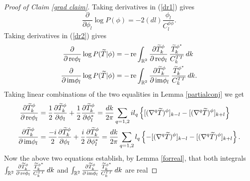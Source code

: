 \documentclass[noinfoline]{imsart}
\newcommand{\re}{\text{\,\rm re}}
\newcommand{\im}{\text{\,\rm im}}
\begin{document}
\begin{proof}[{ Proof of Claim \ref{grad claim}}]
Taking derivatives in (\ref{dr1}) gives
\begin{equation}
\label{grad of prior}
\frac{\partial}{\partial \phi_l}\log P(\phi) = - 2(dl) \frac{\phi_l}{C^{\phi\phi}_{l}}.
\end{equation}
Taking derivatives in (\ref{dr2}) gives
\begin{align}
\frac{\partial}{\partial \re\phi_l}\log P(\widetilde T| \phi) 
&= - \re \int_{\Bbb R^2} \frac{\partial \widetilde T_k^{\phi}}{\partial \re\phi_l} \, \frac{\widetilde T_k^{\phi^*}}{C_k^{TT}}  \,dk \label{ll1}\\
\frac{\partial}{\partial \im\phi_l}\log P(\widetilde T| \phi) 
&=  -\re \int_{\Bbb R^2}\frac{\partial \widetilde T_k^{\phi}}{\partial \im\phi_l} \, \frac{\widetilde T_k^{\phi^*}}{C_k^{TT}} \, dk \label{ll2}.
\end{align}
Taking linear combinations of the two equalities in Lemma \ref{partialconj} we get
\begin{align}
\frac{\partial \widetilde T^\phi_k}{\partial \re \phi_{l}}  &= 
\frac{1}{2}\frac{\partial \widetilde T^\phi_k}{\partial\phi_{l}} + \frac{1}{2}\frac{\partial \widetilde T^\phi_k}{\partial\phi^*_{l}}
=
\frac{dk}{2 \pi}  \sum_{q=1,2} il_q\left\{ [(\nabla^q\widetilde T)^\phi]_{k-l}  -   [(\nabla^q\widetilde T)^\phi]_{k+l}  \right\}\\
\frac{\partial \widetilde T^\phi_k}{\partial \im \phi_{l} }  &= 
\frac{-i}{2}\frac{\partial \widetilde T^\phi_k}{\partial\phi_{l}} + \frac{i}{2}\frac{\partial \widetilde T^\phi_k}{\partial\phi^*_{l}}
=
\frac{ dk}{2 \pi} \sum_{q=1,2} l_q\left\{ -[(\nabla^q\widetilde T)^\phi]_{k-l}  -   [(\nabla^q\widetilde T)^\phi]_{k+l}  \right\}.
\end{align}
Now the above two equations establish, by Lemma \ref{forreal}, that  both integrals $\int_{\Bbb R^2} \frac{\partial \widetilde T_k^\phi}{\partial \re\phi_l} \, \frac{\widetilde T_k^{\phi^*}}{C_k^{TT}}  \,dk$ and $\int_{\Bbb R^2}\frac{\partial \widetilde T_k^\phi}{\partial \im\phi_l} \, \frac{\widetilde T_k^{\phi^*}}{C_k^{TT}} \, dk$ are real

\end{proof}
\end{document}
